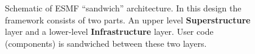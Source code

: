 \begin{figure}
\caption{Schematic of ESMF ``sandwich'' architecture. In this design the framework consists of two parts. An upper level
{\bf Superstructure} layer and a lower-level {\bf Infrastructure} layer. User code (components) is sandwiched between these two layers.}
\label{fig:TheESMFwich}
\end{figure}

